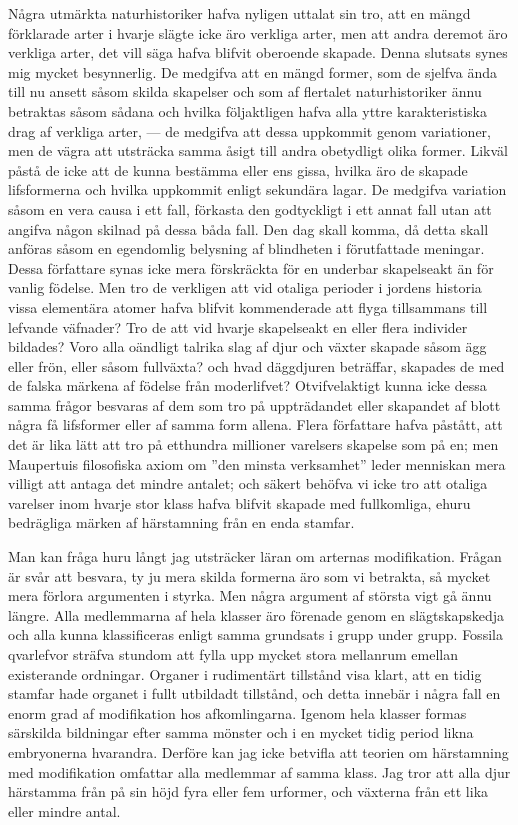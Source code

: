 Några utmärkta naturhistoriker hafva nyligen uttalat sin tro, att en mängd förklarade arter i hvarje slägte icke äro verkliga arter, men att andra deremot äro verkliga arter, det vill säga hafva blifvit oberoende skapade. Denna slutsats synes mig mycket besynnerlig. De medgifva att en mängd former, som de sjelfva ända till nu ansett såsom skilda skapelser och som af flertalet naturhistoriker ännu betraktas såsom sådana och hvilka följaktligen hafva alla yttre karakteristiska drag af verkliga arter, — de medgifva att dessa uppkommit genom variationer, men de vägra att utsträcka samma åsigt till andra obetydligt olika former. Likväl påstå de icke att de kunna bestämma eller ens gissa, hvilka äro de skapade lifsformerna och hvilka uppkommit enligt sekundära lagar. De medgifva variation såsom en vera causa i ett fall, förkasta den godtyckligt i ett annat fall utan att angifva någon skilnad på dessa båda fall. Den dag skall komma, då detta skall anföras såsom en egendomlig belysning af blindheten i förutfattade meningar. Dessa författare synas icke mera förskräckta för en underbar skapelseakt än för vanlig födelse. Men tro de verkligen att vid otaliga perioder i jordens historia vissa elementära atomer hafva blifvit kommenderade att flyga tillsammans till lefvande väfnader? Tro de att vid hvarje skapelseakt en eller flera individer bildades? Voro alla oändligt talrika slag af djur och växter skapade såsom ägg eller frön, eller såsom fullväxta? och hvad däggdjuren beträffar, skapades de med de falska märkena af födelse från moderlifvet? Otvifvelaktigt kunna icke dessa samma frågor besvaras af dem som tro på uppträdandet eller skapandet af blott några få lifsformer eller af samma form allena. Flera författare hafva påstått, att det är lika lätt att tro på etthundra millioner varelsers skapelse som på en; men Maupertuis filosofiska axiom om ”den minsta verksamhet” leder menniskan mera villigt att antaga det mindre antalet; och säkert behöfva vi icke tro att otaliga varelser inom hvarje stor klass hafva blifvit skapade med fullkomliga, ehuru bedrägliga märken af härstamning från en enda stamfar.

Man kan fråga huru långt jag utsträcker läran om arternas modifikation. Frågan är svår att besvara, ty ju mera skilda formerna äro som vi betrakta, så mycket mera förlora argumenten i styrka. Men några argument af största vigt gå ännu längre. Alla medlemmarna af hela klasser äro förenade genom en slägtskapskedja och alla kunna klassificeras enligt samma grundsats i grupp under grupp. Fossila qvarlefvor sträfva stundom att fylla upp mycket stora mellanrum emellan existerande ordningar. Organer i rudimentärt tillstånd visa klart, att en tidig stamfar hade organet i fullt utbildadt tillstånd, och detta innebär i några fall en enorm grad af modifikation hos afkomlingarna. Igenom hela klasser formas särskilda bildningar efter samma mönster och i en mycket tidig period likna embryonerna hvarandra. Derföre kan jag icke betvifla att teorien om härstamning med modifikation omfattar alla medlemmar af samma klass. Jag tror att alla djur härstamma från på sin höjd fyra eller fem urformer, och växterna från ett lika eller mindre antal.

